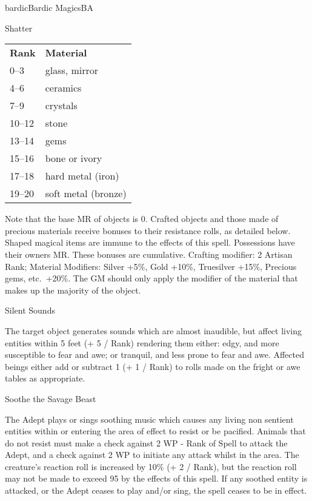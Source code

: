 \begin{college}[2.1]{bardic}{Bardic Magics}{BA}
\begin{spell}[G-7]{Shatter}
\begin{effects}
\begin{tabular}{ll}
\textbf{Rank}	& \textbf{Material} \\
0--3		& glass, mirror \\
4--6		& ceramics \\
7--9		& crystals \\
10--12		& stone \\
13--14		& gems \\
15--16		& bone or ivory \\
17--18		& hard metal (iron) \\
19--20		& soft metal (bronze)  \\		
\end{tabular}

Note that the base MR of objects is 0. Crafted objects and those made
of precious materials receive bonuses to their resistance rolls, as
detailed below. Shaped magical items are immune to the effects of this
spell.  Possessions have their owners MR. These bonuses are
cumulative.  Crafting modifier: 2 \x Artisan Rank; Material Modifiers:
Silver +5\%, Gold +10\%, Truesilver +15\%, Precious gems, etc.\
+20\%. The GM should only apply the modifier of the material that
makes up the majority of the object.
\end{effects}
\end{spell}


\begin{spell}[G-8]{Silent Sounds}

\begin{effects}
The target object generates sounds which are almost inaudible, but
affect living entities within 5 feet (+ 5 / Rank) rendering them
either: edgy, and more susceptible to fear and awe; or tranquil, and
less prone to fear and awe. Affected beings either add or subtract 1
(+ 1 / Rank) to rolls made on the fright or awe tables as appropriate.
\end{effects}
\end{spell}

\begin{spell}[G-9]{Soothe the Savage Beast}

\begin{effects}
The Adept plays or sings soothing music which causes any living non
sentient entities within or entering the area of effect to resist or
be pacified. Animals that do not resist must make a check against 2 \x
WP - Rank of Spell to attack the Adept, and a check against 2 \x WP to
initiate any attack whilst in the area. The creature's reaction roll
is increased by 10\% (+ 2 / Rank), but the reaction roll may not be
made to exceed 95 by the effects of this spell. If any soothed entity
is attacked, or the Adept ceases to play and/or sing, the spell ceases
to be in effect.
\end{effects}
\end{spell}


\end{college}
